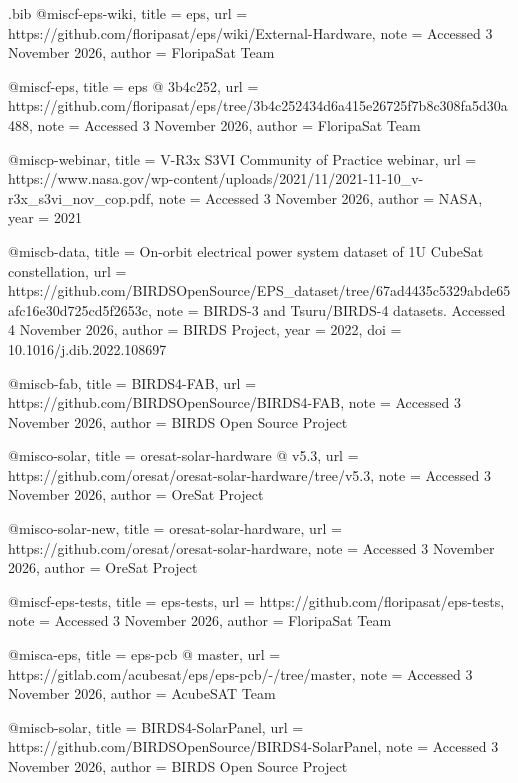 \begin{filecontents*}[overwrite]{\jobname.bib}
@misc{f-eps-wiki,
  title = {{eps}},
  url = {https://github.com/floripasat/eps/wiki/External-Hardware},
  note = {Accessed 3 November 2026},
  author = {{FloripaSat Team}}
}

@misc{f-eps,
  title = {{eps @ 3b4c252}},
  url = {https://github.com/floripasat/eps/tree/3b4c252434d6a415e26725f7b8c308fa5d30a488},
  note = {Accessed 3 November 2026},
  author = {{FloripaSat Team}}
}

@misc{p-webinar,
  title = {{V-\allowbreak{}R3x S3VI Community of Practice webinar}},
  url = {https://www.nasa.gov/wp-content/uploads/2021/11/2021-11-10_v-r3x_s3vi_nov_cop.pdf},
  note = {Accessed 3 November 2026},
  author = {{NASA}},
  year = {2021}
}

@misc{b-data,
  title = {{On-\allowbreak{}orbit electrical power system dataset of 1U CubeSat constellation}},
  url = {https://github.com/BIRDSOpenSource/EPS_dataset/tree/67ad4435c5329abde65afc16e30d725cd5f2653c},
  note = {BIRDS-3 and Tsuru/BIRDS-4 datasets. Accessed 4 November 2026},
  author = {{BIRDS Project}},
  year = {2022},
  doi = {10.1016/j.dib.2022.108697}
}

@misc{b-fab,
  title = {{BIRDS4-\allowbreak{}FAB}},
  url = {https://github.com/BIRDSOpenSource/BIRDS4-FAB},
  note = {Accessed 3 November 2026},
  author = {{BIRDS Open Source Project}}
}

@misc{o-solar,
  title = {{oresat-\allowbreak{}solar-\allowbreak{}hardware @ v5.3}},
  url = {https://github.com/oresat/oresat-solar-hardware/tree/v5.3},
  note = {Accessed 3 November 2026},
  author = {{OreSat Project}}
}

@misc{o-solar-new,
  title = {{oresat-\allowbreak{}solar-\allowbreak{}hardware}},
  url = {https://github.com/oresat/oresat-solar-hardware},
  note = {Accessed 3 November 2026},
  author = {{OreSat Project}}
}

@misc{f-eps-tests,
  title = {{eps-\allowbreak{}tests}},
  url = {https://github.com/floripasat/eps-tests},
  note = {Accessed 3 November 2026},
  author = {{FloripaSat Team}}
}

@misc{a-eps,
  title = {{eps-\allowbreak{}pcb @ master}},
  url = {https://gitlab.com/acubesat/eps/eps-pcb/-/tree/master},
  note = {Accessed 3 November 2026},
  author = {{AcubeSAT Team}}
}

@misc{b-solar,
  title = {{BIRDS4-\allowbreak{}SolarPanel}},
  url = {https://github.com/BIRDSOpenSource/BIRDS4-SolarPanel},
  note = {Accessed 3 November 2026},
  author = {{BIRDS Open Source Project}}
}


\end{filecontents*}
